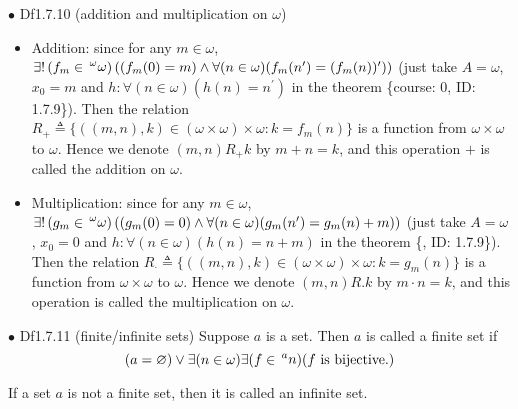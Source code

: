 \documentclass{article}
\begin{document}
\begin{Df}{$\bullet$ Df1.7.10 (addition and multiplication on $\omega$)}
    \begin{itemize}
        \item Addition: since for any $m\in \omega$, $\exists! \left(f_m\in \sideset{^\omega}{} {\mathop{\omega}}\right) \left((f_m(0) = m)\land \forall (n\in \omega)(f_m(n^\prime) = (f_m(n))^\prime)\right)$ (just take $A = \omega$, $x_0 = m$ and $h: \forall (n\in \omega)(h(n) = n^\prime)$ in the theorem \{course: 0, ID: 1.7.9\}). Then the relation $R_+ \triangleq \{((m,n),k)\in (\omega\times\omega)\times\omega: k = f_m(n)\}$ is a function from $\omega\times\omega$ to $\omega$. Hence we denote $(m,n)R_+ k$ by $m + n = k$, and this operation $+$ is called the addition on $\omega$.
        \item Multiplication: since for any $m\in \omega$, $\exists! \left(g_m\in \sideset{^\omega}{} {\mathop{\omega}}\right) \left((g_m(0) = 0)\land \forall (n\in \omega)(g_m(n^\prime) = g_m(n)+m)\right)$ (just take $A = \omega$, $x_0 = 0$ and $h: \forall (n\in \omega)(h(n) = n+m)$ in the theorem \{, ID: 1.7.9\}). Then the relation $R_\cdot\triangleq\{((m,n),k)\in (\omega\times\omega)\times\omega: k = g_m(n)\}$ is a function from $\omega\times\omega$ to $\omega$. Hence we denote $(m,n)R. k$ by $m\cdot n = k$, and this operation is called the multiplication on $\omega$.
    \end{itemize}
\end{Df}

\begin{Df}{$\bullet$ Df1.7.11 (finite/infinite sets)}
    Suppose $a$ is a set. Then $a$ is called a finite set if
    $$(a=\varnothing)\lor \exists (n\in\omega)\exists (f\in \sideset{^a}{} {\mathop{n}})(f\text{ is bijective.})$$
\end{Df}
\textcolor{Df}{If a set $a$ is not a finite set, then it is called an infinite set.}
\end{document}
